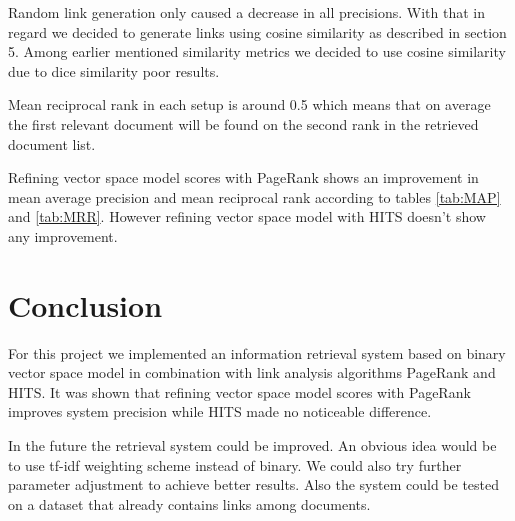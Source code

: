 \documentclass[10pt, a4paper]{article}
\begin{document}
Random link generation only caused a decrease in all precisions. With that in regard we decided to generate links using cosine similarity as described in section 5. Among earlier mentioned similarity metrics we decided to use cosine similarity due to dice similarity poor results.

Mean reciprocal rank in each setup is around 0.5 which means that on average the first relevant document will be found on the second rank in the retrieved document list.

Refining vector space model scores with PageRank shows an improvement in mean average precision and mean reciprocal rank according to tables \ref{tab:MAP} and \ref{tab:MRR}. However refining vector space model with HITS doesn't show any improvement.

\section{Conclusion}
For this project we implemented an information retrieval system based on binary vector space model in combination with link analysis algorithms PageRank and HITS. It was shown that refining vector space model scores with PageRank improves system precision while HITS made no noticeable difference.

In the future the retrieval system could be improved. An obvious idea would be to use tf-idf weighting scheme instead of binary. We could also try further parameter adjustment to achieve better results. Also the system could be tested on a dataset that already contains links among documents.




\end{document}

